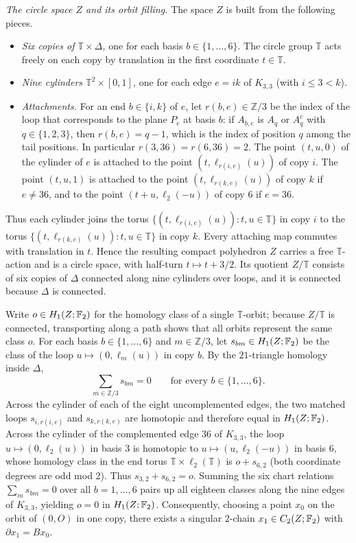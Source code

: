 \emph{The circle space $Z$ and its orbit filling.} The space $Z$ is built from the following pieces.
\begin{itemize}
\item \emph{Six copies of $\mathbb T\times\Delta$,} one for each basis $b\in\{1,\ldots,6\}$. The circle group $\mathbb T$ acts freely on each copy by translation in the first coordinate $t\in\mathbb T$.
\item \emph{Nine cylinders $\mathbb T^2\times[0,1]$,} one for each edge $e=ik$ of $K_{3,3}$ (with $i\le3<k$).
\item \emph{Attachments.} For an end $b\in\{i,k\}$ of $e$, let $r(b,e)\in\mathbb Z/3$ be the index of the loop that corresponds to the plane $P_e$ at basis $b$: if $A_{b,e}$ is $A_q$ or $A_q^c$ with $q\in\{1,2,3\}$, then $r(b,e)=q-1$, which is the index of position $q$ among the tail positions. In particular $r(3,36)=r(6,36)=2$. The point $(t,u,0)$ of the cylinder of $e$ is attached to the point $(t,\ell_{r(i,e)}(u))$ of copy $i$. The point $(t,u,1)$ is attached to the point $(t,\ell_{r(k,e)}(u))$ of copy $k$ if $e\ne36$, and to the point $(t+u,\ell_2(-u))$ of copy $6$ if $e=36$.
\end{itemize}
Thus each cylinder joins the torus $\{(t,\ell_{r(i,e)}(u)):t,u\in\mathbb T\}$ in copy $i$ to the torus $\{(t,\ell_{r(k,e)}(u)):t,u\in\mathbb T\}$ in copy $k$. Every attaching map commutes with translation in $t$. Hence the resulting compact polyhedron $Z$ carries a free $\mathbb T$-action and is a circle space, with half-turn $t\mapsto t+3/2$. Its quotient $Z/\mathbb T$ consists of six copies of $\Delta$ connected along nine cylinders over loops, and it is connected because $\Delta$ is connected.

Write $o\in H_1(Z;\mathbb F_2)$ for the homology class of a single $\mathbb T$-orbit; because $Z/\mathbb T$ is connected, transporting along a path shows that all orbits represent the same class $o$. For each basis $b\in\{1,\ldots,6\}$ and $m\in\mathbb Z/3$, let $s_{bm}\in H_1(Z;\mathbb F_2)$ be the class of the loop $u\mapsto(0,\ell_m(u))$ in copy $b$. By the $21$-triangle homology inside $\Delta$,
\[
 \sum_{m\in\mathbb Z/3} s_{bm}=0\qquad\text{for every }b\in\{1,\ldots,6\}.
\]
Across the cylinder of each of the eight uncomplemented edges, the two matched loops $s_{i,r(i,e)}$ and $s_{k,r(k,e)}$ are homotopic and therefore equal in $H_1(Z;\mathbb F_2)$. Across the cylinder of the complemented edge $36$ of $K_{3,3}$, the loop $u\mapsto(0,\ell_2(u))$ in basis $3$ is homotopic to $u\mapsto(u,\ell_2(-u))$ in basis $6$, whose homology class in the end torus $\mathbb T\times\ell_2(\mathbb T)$ is $o+s_{6,2}$ (both coordinate degrees are odd mod $2$). Thus $s_{3,2}+s_{6,2}=o$. Summing the six chart relations $\sum_m s_{bm}=0$ over all $b=1,\ldots,6$ pairs up all eighteen classes along the nine edges of $K_{3,3}$, yielding $o=0$ in $H_1(Z;\mathbb F_2)$. Consequently, choosing a point $x_0$ on the orbit of $(0,O)$ in one copy, there exists a singular $2$-chain $x_1\in C_2(Z;\mathbb F_2)$ with $\partial x_1=Bx_0$.

